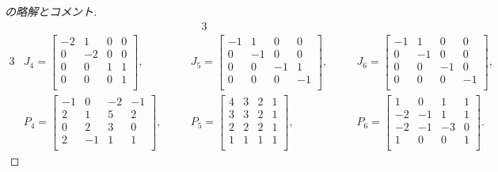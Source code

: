 \documentclass[12pt,twoside]{jarticle}
\begin{document}
\begin{proof}[\protect{[158]}の略解とコメント]
{\begin{alignat*}{3}
\end{alignat*}
\begin{alignat*}{3}
  &
  J_4 =
  \begin{bmatrix}
    -2 &  1 &  0 &  0 \\
     0 & -2 &  0 &  0 \\
     0 &  0 &  1 &  1 \\
     0 &  0 &  0 &  1 \\
  \end{bmatrix},
  & \quad &
  J_5 =
  \begin{bmatrix}
    -1 &  1 &  0 &  0 \\
     0 & -1 &  0 &  0 \\
     0 &  0 & -1 &  1 \\
     0 &  0 &  0 & -1 \\
  \end{bmatrix},
  & \quad &
  J_6 =
  \begin{bmatrix}
    -1 &  1 &  0 &  0 \\
     0 & -1 &  0 &  0 \\
     0 &  0 & -1 &  0 \\
     0 &  0 &  0 & -1 \\
  \end{bmatrix},
  \\ &
  P_4 =
  \begin{bmatrix}
    -1 &  0 & -2 & -1 \\
     2 &  1 &  5 &  2 \\
     0 &  2 &  3 &  0 \\
     2 & -1 &  1 &  1 \\
  \end{bmatrix},
  & \quad &
  P_5 =
  \begin{bmatrix}
    4 & 3 & 2 & 1 \\
    3 & 3 & 2 & 1 \\
    2 & 2 & 2 & 1 \\
    1 & 1 & 1 & 1 \\
  \end{bmatrix},
  & \quad &
  P_6 =
  \begin{bmatrix}
     1 &  0 &  1 &  1 \\
    -2 & -1 &  1 &  1 \\
    -2 & -1 & -3 &  0 \\
     1 &  0 &  0 &  1 \\
  \end{bmatrix}.
\end{alignat*}
}


\end{proof}
\end{document}
